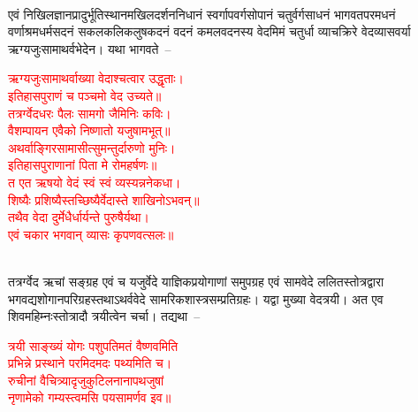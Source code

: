 \\
\begin{sloppypar}\justifying\noindent\hspace{10mm} एवं निखिल\-ज्ञान\-प्रादुर्भूति\-स्थानमखिल\-दर्शन\-निधानं स्वर्गापवर्ग\-सोपानं चतुर्वर्ग\-साधनं भागवत\-परम\-धनं वर्णाश्रम\-धर्म\-सदनं सकल\-कलि\-कलुष\-कदनं वदनं कमल\-वदनस्य वेदमिमं चतुर्धा व्याचक्रिरे वेद\-व्यास\-वर्या ऋग्यजुः\-सामाथर्व\-भेदेन। यथा भागवते~–\end{sloppypar}
\centering\textcolor{red}{ऋग्यजुःसामाथर्वाख्या वेदाश्चत्वार उद्धृताः।\nopagebreak\\
इतिहासपुराणं च पञ्चमो वेद उच्यते॥\\
तत्रर्ग्वेदधरः पैलः सामगो जैमिनिः कविः।\nopagebreak\\
वैशम्पायन एवैको निष्णातो यजुषामभूत्॥\\
अथर्वाङ्गिरसामासीत्सुमन्तुर्दारुणो मुनिः।\nopagebreak\\
इतिहासपुराणानां पिता मे रोमहर्षणः॥\\
त एत ऋषयो वेदं स्वं स्वं व्यस्यन्ननेकधा। \nopagebreak\\
शिष्यैः प्रशिष्यैस्तच्छिष्यैर्वेदास्ते शाखिनोऽभवन्॥\\
तथैव वेदा दुर्मेधैर्धार्यन्ते पुरुषैर्यथा।\nopagebreak\\
एवं चकार भगवान् व्यासः कृपणवत्सलः॥}\nopagebreak\\
\\
\begin{sloppypar}\justifying\noindent\hspace{10mm} तत्रर्ग्वेद ऋचां सङ्ग्रह एवं च यजुर्वेदे याज्ञिक\-प्रयोगाणां समुपग्रह एवं सामवेदे ललित\-स्तोत्र\-द्वारा भगवद्यशो\-गान\-परिग्रहस्तथाऽथर्व\-वेदे सामरिक\-शास्त्र\-सम्प्रतिग्रहः। यद्वा मुख्या वेद\-त्रयी। अत एव शिवमहिम्नःस्तोत्रादौ त्रयीत्वेन चर्चा। तद्यथा~–\end{sloppypar}
\centering\textcolor{red}{त्रयी साङ्ख्यं योगः पशुपतिमतं वैष्णवमिति\nopagebreak\\
प्रभिन्ने प्रस्थाने परमिदमदः पथ्यमिति च।\nopagebreak\\
रुचीनां वैचित्र्यादृजुकुटिलनानापथजुषां\nopagebreak\\
नृणामेको गम्यस्त्वमसि पयसामर्णव इव॥}\nopagebreak\\
\\
